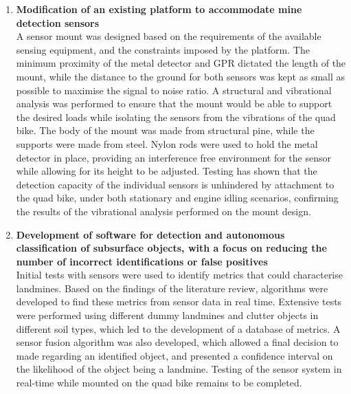 \documentclass[main.tex]{subfiles}
\begin{document}
\begin{enumerate}
\item \textbf{Modification of an existing platform to accommodate mine detection sensors}\\ 
A sensor mount was designed based on the requirements of the available sensing equipment, and the constraints imposed by the platform. The minimum proximity of the metal detector and GPR dictated the length of the mount, while the distance to the ground for both sensors was kept as small as possible to maximise the signal to noise ratio. A structural and vibrational analysis was performed to ensure that the mount would be able to support the desired loads while isolating the sensors from the vibrations of the quad bike. The body of the mount was made from structural pine, while the supports were made from steel. Nylon rods were used to hold the metal detector in place, providing an interference free environment for the sensor while allowing for its height to be adjusted.   
Testing has shown that the detection capacity of the individual sensors is unhindered by attachment to the quad bike, under both stationary and engine idling scenarios, confirming the results of the vibrational analysis performed on the mount design.

\item \textbf{Development of software for detection and autonomous classification of subsurface objects, with a focus on reducing the number of incorrect identifications or false positives}\\ 
Initial tests with sensors were used to identify metrics that could characterise landmines. Based on the findings of the literature review, algorithms were developed to find these metrics from sensor data in real time. Extensive tests were performed using different dummy landmines and clutter objects in different soil types, which led to the development of a database of metrics. A sensor fusion algorithm was also developed, which allowed a final decision to made regarding an identified object, and presented a confidence interval on the likelihood of the object being a landmine. Testing of the sensor system in real-time while mounted on the quad bike remains to be completed.
\end{enumerate}
\end{document}
